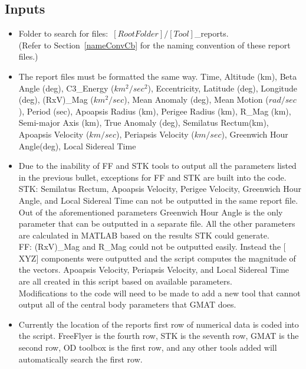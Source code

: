 \subsection{Inputs}
\begin{itemize}
    \item Folder to search for files$:$ $[Root Folder]/[Tool]$\_reports. \\
    (Refer to Section~\ref{nameConvCb} for the naming convention
    of these report files.)
    \item The report files must be formatted the same way. Time, Altitude
    (km), Beta Angle (deg), C3\_Energy ($km^2/sec^2$), Eccentricity,
    Latitude (deg), Longitude (deg), (RxV)\_Mag ($km^2/sec$), Mean Anomaly
    (deg), Mean Motion ($rad/sec$), Period (sec), Apoapsis Radius (km),
    Perigee Radius (km), R\_Mag (km), Semi-major Axis (km), True Anomaly
    (deg), Semilatus Rectum(km), Apoapsis Velocity ($km/sec$), Periapsis
    Velocity ($km/sec$), Greenwich Hour Angle(deg), Local Sidereal Time
    \item Due to the inability of FF and STK tools to output all the
    parameters listed in the previous bullet, exceptions for FF and STK
    are built into the code.\\

    STK: Semilatus Rectum, Apoapsis Velocity, Perigee Velocity,
    Greenwich Hour Angle, and Local Sidereal Time can not be outputted
    in the same report file. Out of the aforementioned parameters
    Greenwich Hour Angle is the only parameter that can be outputted in
    a separate file. All the other parameters are calculated in MATLAB
    based on the results STK could generate.\\

    FF: (RxV)\_Mag and R\_Mag could not be outputted easily. Instead the
    $[$XYZ$]$ components were outputted and the script computes the
    magnitude of the vectors. Apoapsis Velocity, Periapsis Velocity, and
    Local Sidereal Time are all created in this script based on
    available parameters.\\

    Modifications to the code will need to be made to add a new tool
    that cannot output all of the central body parameters that GMAT
    does.\\
    \item Currently the location of the reports first row of
    numerical data is coded into the script. FreeFlyer is the fourth
    row, STK is the seventh row, GMAT is the second row, OD toolbox is
    the first row, and any other tools added will automatically search
    the first row.
\end{itemize}

